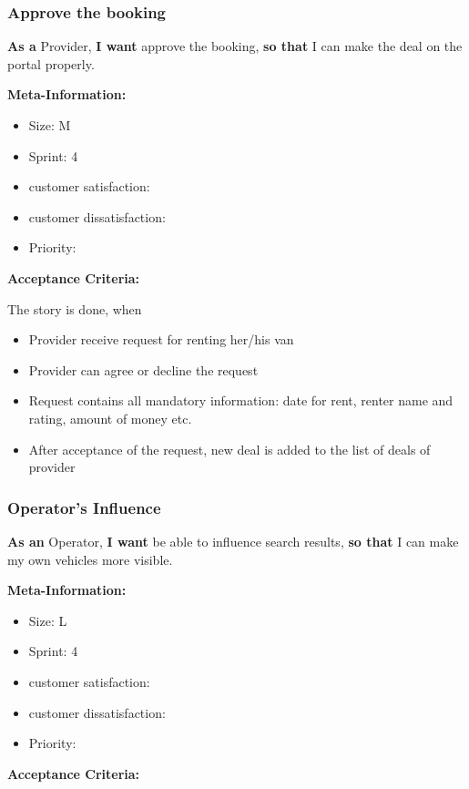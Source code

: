\subsubsection{Approve the booking}

\textbf{As a} Provider,\hfill\break
\textbf{I want} approve the booking,\hfill\break
\textbf{so that} I can make the deal on the portal properly.

\textbf{Meta-Information:}
\begin{itemize}
    \item Size: M
    \item Sprint: 4
    \item customer satisfaction:
    \item customer dissatisfaction:
    \item Priority:
\end{itemize}

\textbf{Acceptance Criteria:}

The story is done, when
\begin{itemize}
    \item Provider receive request for renting her/his van
    \item Provider can agree or decline the request
    \item Request contains all mandatory information: date for rent, renter name and rating, amount of money etc.
    \item After acceptance of the request, new deal is added to the list of deals of provider
\end{itemize}

\subsubsection{Operator's Influence}

\textbf{As an} Operator,\hfill\break
\textbf{I want} be able to influence search results,\hfill\break
\textbf{so that} I can make my own vehicles more visible.

\textbf{Meta-Information:}
\begin{itemize}
    \item Size: L
    \item Sprint: 4
    \item customer satisfaction:
    \item customer dissatisfaction:
    \item Priority:
\end{itemize}

\textbf{Acceptance Criteria:}

